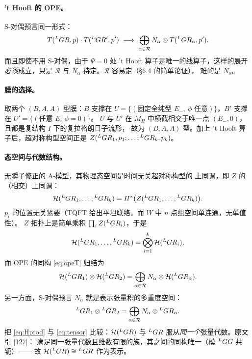 \paragraph{'t Hooft{} 的 OPE。}S-对偶预言同一形式：
\begin{equation}
T({}^{L}G R,p)\cdot T({}^{L}G R',p')\ \longrightarrow\
\bigoplus_{\alpha\in\mathcal{R}}N_\alpha\otimes T({}^{L}G R_\alpha,p').
\label{eq:opeT}
\end{equation}
而且即使不用 S-对偶，由于 $\Psi=0$ 处 't Hooft{} 算子是唯一的线算子，这样的展开
\emph{必须}成立，只是 $\mathcal{R}$ 与 $N_\alpha$ 待定。$\mathcal{R}$ 容易定（§6.4 的简单论证），
难的是 $N_\alpha$。\pA\anchor{src p.169}

\paragraph{膜的选择。}取两个 $(B,A,A)$ 型膜：$B$ 支撑在
$U=\{(\text{固定全纯型 }E_-,\ \phi\text{ 任意})\}$，$B'$ 支撑在 $U'=\{(\text{任意 }E,\ \phi=0)\}$。
$U$ 与 $U'$ 在 $M_H$ 中横截相交于唯一点 $(E_-,0)$，且都是复结构 $I$ 下的复拉格朗日子流形，
故为 $(B,A,A)$ 型。加上 't Hooft{} 算子后，超对称构型空间正是
$Z({}^{L}G R_1,p_1;\dots;{}^{L}G R_k,p_k)$。\pA{}

\paragraph{态空间与代数结构。}无瞬子修正的 A-模型，其物理态空间是时间无关超对称构型的
上同调，即 $Z$ 的（相交）上同调：
\begin{equation}
\mathcal{H}({}^{L}G R_1,\dots,{}^{L}G R_k)=H^*\bigl(Z({}^{L}G R_1,\dots,{}^{L}G R_k)\bigr).
\label{eq:Hspace}
\end{equation}
$p_i$ 的位置无关紧要（TQFT 给出平坦联络，而 $W$ 中 $n$ 点组空间单连通，无单值性）。
$Z$ 拓扑上是简单乘积 $\prod_i Z({}^{L}G R_i)$，于是
\begin{equation}
\mathcal{H}({}^{L}G R_1,\dots,{}^{L}G R_k)=\bigotimes_{i=1}^k\mathcal{H}({}^{L}G R_i),
\label{eq:Htensor}
\end{equation}
而 OPE 的同构 \eqref{eq:opeT} 归结为
\begin{equation}
\mathcal{H}({}^{L}G R_1)\otimes\mathcal{H}({}^{L}G R_2)
=\bigoplus_{\alpha\in\mathcal{R}}N_\alpha\otimes\mathcal{H}({}^{L}G R_\alpha).
\label{eq:Hprod}
\end{equation}
另一方面，S-对偶预言 $N_\alpha$ 就是表示张量积的多重度空间：
\begin{equation}
{}^{L}G R_1\otimes{}^{L}G R_2
=\bigoplus_{\alpha\in\mathcal{R}}N_\alpha\otimes{}^{L}G R_\alpha .
\label{eq:tensor}
\end{equation}
把 \eqref{eq:Hprod} 与 \eqref{eq:tensor} 比较：$\mathcal{H}({}^{L}G R)$ 与 ${}^{L}G R$ 服从\emph{同一个}张量代数。原文引 [127]：
满足同一张量代数且维数有限的族，其之间的同构唯一（模 ${}^{L}G G$ 共轭）——
故 $\mathcal{H}({}^{L}G R)\cong{}^{L}G R$ 作为表示。\pA{}

